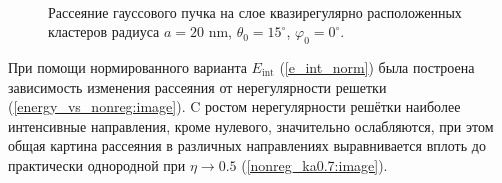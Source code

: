     \begin{figure}[H]

        \hfil
        \\
        \caption{Рассеяние гауссового пучка на слое квазирегулярно расположенных кластеров радиуса $a = 20$ nm, $\theta_0 = 15^{\circ}$, $\varphi_0 = 0^{\circ}$.}\label{nonreg_ka0.7:image}
    \end{figure}


При помощи нормированного варианта $E_{\textrm{int}}$ (\autoref{e_int_norm}) была построена зависимость изменения рассеяния от нерегулярности решетки (\autoref{energy_vs_nonreg:image}). C ростом нерегулярности решётки наиболее интенсивные направления, кроме нулевого, значительно ослабляются, при этом общая картина рассеяния в различных направлениях выравнивается вплоть до практически однородной при $\eta \to 0.5$ (\autoref{nonreg_ka0.7:image}).

